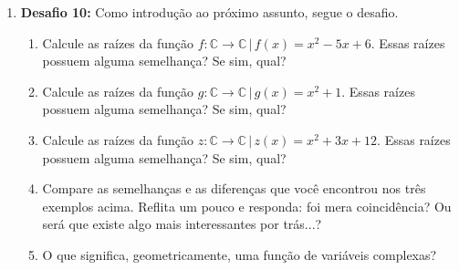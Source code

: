 \documentclass[a4paper, 11pt]{article}
\begin{document}
\begin{enumerate}
\begin{enumerate}
	\end{enumerate}

\item \textbf{Desafio 10:} Como introdução ao próximo assunto, segue o desafio.
	\begin{enumerate}
	\item Calcule as raízes da função $f: \mathbb{C} \longrightarrow \mathbb{C} \, | \, f(x) = x^2 -5x + 6$. Essas raízes possuem alguma semelhança? Se sim, qual?
	\item Calcule as raízes da função $g: \mathbb{C} \longrightarrow \mathbb{C} \, | \, g(x) = x^2 + 1$. Essas raízes possuem alguma semelhança? Se sim, qual?
	\item Calcule as raízes da função $z: \mathbb{C} \longrightarrow \mathbb{C} \, | \, z(x) = x^2 + 3x + 12$. Essas raízes possuem alguma semelhança? Se sim, qual?
	\item Compare as semelhanças e as diferenças que você encontrou nos três exemplos acima. Reflita um pouco e responda: foi mera coincidência? Ou será que existe algo mais interessantes por trás...?
	\item O que significa, geometricamente, uma função de variáveis complexas?
	\end{enumerate}















\end{enumerate}
\end{document}
